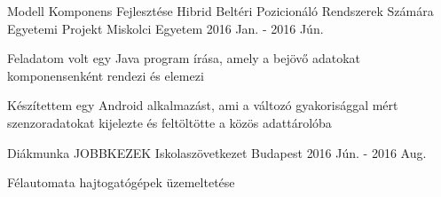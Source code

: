 

\begin{cventries}

  \cventry
    {Modell Komponens Fejlesztése Hibrid Beltéri Pozicionáló Rendszerek Számára} %
    {Egyetemi Projekt} %
    {Miskolci Egyetem} %
    {2016 Jan. - 2016 Jún.} %
    {
      \begin{cvitems} %
        \item {Feladatom volt egy Java program írása, amely a bejövő adatokat komponensenként rendezi és elemezi}
        \item {Készítettem egy Android alkalmazást, ami a változó gyakorisággal mért szenzoradatokat kijelezte és feltöltötte a közös adattárolóba}
      \end{cvitems}
    }

  \cventry
    {Diákmunka} %
    {JOBBKEZEK Iskolaszövetkezet} %
    {Budapest} %
    {2016 Jún. - 2016 Aug.} %
    {
      \begin{cvitems} %
        \item {Félautomata hajtogatógépek üzemeltetése}
      \end{cvitems}
    }


\end{cventries}
